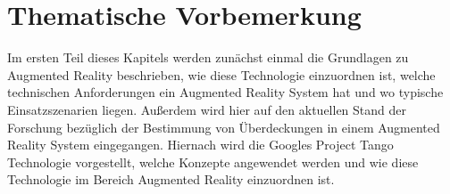 \chapter{Thematische Vorbemerkung} \label{sec:thema}

Im ersten Teil dieses Kapitels werden zunächst einmal die Grundlagen zu Augmented Reality beschrieben, wie diese Technologie einzuordnen ist, welche technischen Anforderungen ein Augmented Reality System hat und wo typische Einsatzszenarien liegen. Außerdem wird hier auf den aktuellen Stand der Forschung bezüglich der Bestimmung von Überdeckungen in einem Augmented Reality System eingegangen. Hiernach wird die Googles Project Tango Technologie vorgestellt, welche Konzepte angewendet werden und wie diese Technologie im Bereich Augmented Reality einzuordnen ist. 






